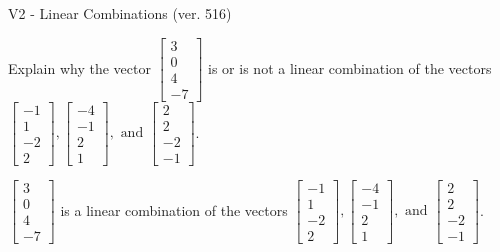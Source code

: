 \begin{exercise}
  \begin{exerciseTitle}V2 - Linear Combinations (ver. 516)\end{exerciseTitle}
  \begin{exerciseStatement}
    Explain why the vector \(\left[\begin{array}{c}
3 \\
0 \\
4 \\
-7
\end{array}\right]\)  is or is not a linear 
	combination of the vectors \(\left[\begin{array}{c}
-1 \\
1 \\
-2 \\
2
\end{array}\right] , \left[\begin{array}{c}
-4 \\
-1 \\
2 \\
1
\end{array}\right] , \text{ and } \left[\begin{array}{c}
2 \\
2 \\
-2 \\
-1
\end{array}\right]\).
	


  \end{exerciseStatement}
  \begin{exerciseAnswer}
   \(\left[\begin{array}{c}
3 \\
0 \\
4 \\
-7
\end{array}\right]\) 
  	 is  
	a linear combination of the vectors \(\left[\begin{array}{c}
-1 \\
1 \\
-2 \\
2
\end{array}\right] , \left[\begin{array}{c}
-4 \\
-1 \\
2 \\
1
\end{array}\right] , \text{ and } \left[\begin{array}{c}
2 \\
2 \\
-2 \\
-1
\end{array}\right]\).

	
  


  \end{exerciseAnswer}
\end{exercise}